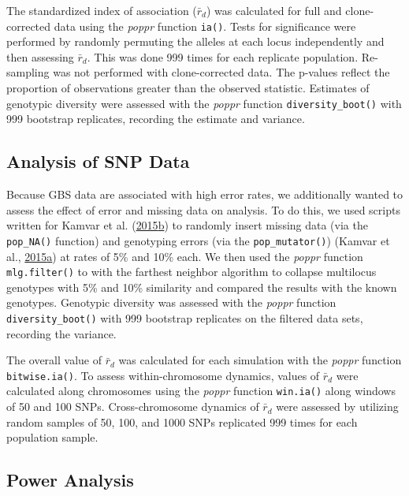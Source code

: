 \documentclass[double,12pt]{beavtex}
\begin{document}
  The standardized index of association (\(\bar{r}_d\)) was calculated for
  full and clone-corrected data using the \emph{poppr} function
  \texttt{ia()}. Tests for significance were performed by randomly
  permuting the alleles at each locus independently and then assessing
  \(\bar{r}_d\). This was done 999 times for each replicate population.
  Re-sampling was not performed with clone-corrected data. The p-values
  reflect the proportion of observations greater than the observed
  statistic. Estimates of genotypic diversity were assessed with the
  \emph{poppr} function \texttt{diversity\_boot()} with 999 bootstrap
  replicates, recording the estimate and variance.
  
  \subsection{Analysis of SNP Data}\label{analysis-of-snp-data}
  
  Because GBS data are associated with high error rates, we additionally
  wanted to assess the effect of error and missing data on analysis. To do
  this, we used scripts written for Kamvar et al.
  (\protect\hyperlink{ref-kamvar2015novel}{2015}\protect\hyperlink{ref-kamvar2015novel}{b})
  to randomly insert missing data (via the \texttt{pop\_NA()} function)
  and genotyping errors (via the \texttt{pop\_mutator()}) (Kamvar et al.,
  \protect\hyperlink{ref-kamvar2015poppr2supp}{2015}\protect\hyperlink{ref-kamvar2015poppr2supp}{a})
  at rates of 5\% and 10\% each. We then used the \emph{poppr} function
  \texttt{mlg.filter()} to with the farthest neighbor algorithm to
  collapse multilocus genotypes with 5\% and 10\% similarity and compared
  the results with the known genotypes. Genotypic diversity was assessed
  with the \emph{poppr} function \texttt{diversity\_boot()} with 999
  bootstrap replicates on the filtered data sets, recording the variance.
  
  The overall value of \(\bar{r}_d\) was calculated for each simulation
  with the \emph{poppr} function \texttt{bitwise.ia()}. To assess
  within-chromosome dynamics, values of \(\bar{r}_d\) were calculated
  along chromosomes using the \emph{poppr} function \texttt{win.ia()}
  along windows of 50 and 100 SNPs. Cross-chromosome dynamics of
  \(\bar{r}_d\) were assessed by utilizing random samples of 50, 100, and
  1000 SNPs replicated 999 times for each population sample.
  
  \subsection{Power Analysis}\label{power-analysis}
  
\end{document}
